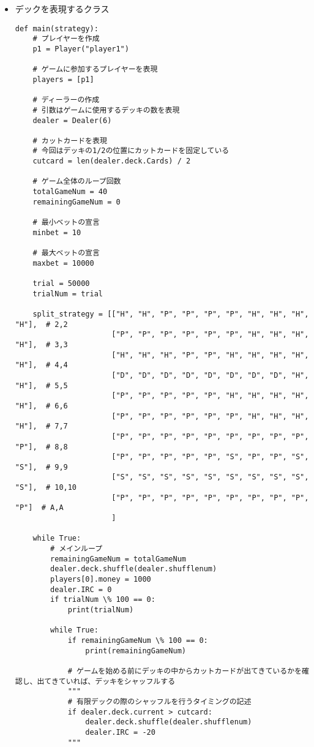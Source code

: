 \begin{itemize}
\item デックを表現するクラス
\begin{lstlisting}
def main(strategy):
    # プレイヤーを作成
    p1 = Player("player1")

    # ゲームに参加するプレイヤーを表現
    players = [p1]

    # ディーラーの作成
    # 引数はゲームに使用するデッキの数を表現
    dealer = Dealer(6)

    # カットカードを表現
    # 今回はデッキの1/2の位置にカットカードを固定している
    cutcard = len(dealer.deck.Cards) / 2

    # ゲーム全体のループ回数
    totalGameNum = 40
    remainingGameNum = 0

    # 最小ベットの宣言
    minbet = 10

    # 最大ベットの宣言
    maxbet = 10000

    trial = 50000
    trialNum = trial

    split_strategy = [["H", "H", "P", "P", "P", "P", "H", "H", "H", "H"],  # 2,2
                      ["P", "P", "P", "P", "P", "P", "H", "H", "H", "H"],  # 3,3
                      ["H", "H", "H", "P", "P", "H", "H", "H", "H", "H"],  # 4,4
                      ["D", "D", "D", "D", "D", "D", "D", "D", "H", "H"],  # 5,5
                      ["P", "P", "P", "P", "P", "H", "H", "H", "H", "H"],  # 6,6
                      ["P", "P", "P", "P", "P", "P", "H", "H", "H", "H"],  # 7,7
                      ["P", "P", "P", "P", "P", "P", "P", "P", "P", "P"],  # 8,8
                      ["P", "P", "P", "P", "P", "S", "P", "P", "S", "S"],  # 9,9
                      ["S", "S", "S", "S", "S", "S", "S", "S", "S", "S"],  # 10,10
                      ["P", "P", "P", "P", "P", "P", "P", "P", "P", "P"]  # A,A
                      ]

    while True:
        # メインループ
        remainingGameNum = totalGameNum
        dealer.deck.shuffle(dealer.shufflenum)
        players[0].money = 1000
        dealer.IRC = 0
        if trialNum \% 100 == 0:
            print(trialNum)

        while True:
            if remainingGameNum \% 100 == 0:
                print(remainingGameNum)

            # ゲームを始める前にデッキの中からカットカードが出てきているかを確認し、出てきていれば、デッキをシャッフルする
            """
            # 有限デックの際のシャッフルを行うタイミングの記述
            if dealer.deck.current > cutcard:
                dealer.deck.shuffle(dealer.shufflenum)
                dealer.IRC = -20
            """


\end{lstlisting}
\end{itemize}
